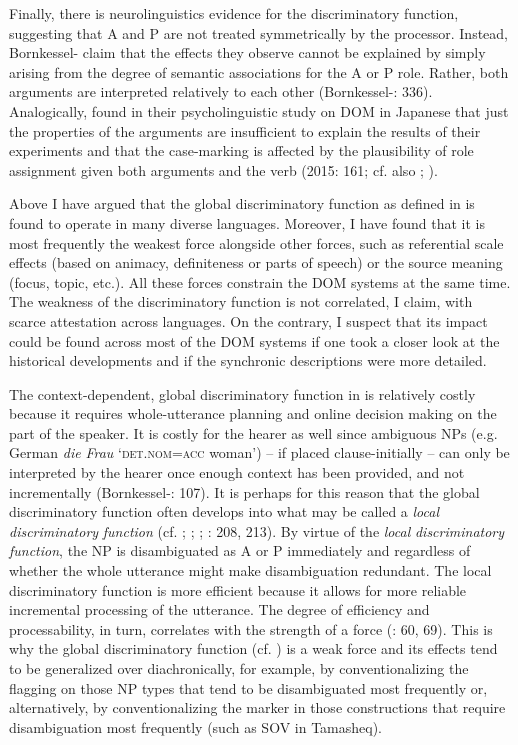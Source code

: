 \documentclass[output=paper]{langsci/langscibook}
\begin{document}
Finally, there is neurolinguistics evidence for the discriminatory function, suggesting that A and P are not treated symmetrically by the processor. Instead, Bornkessel-\citet{SchlesewskySchlesewsky2015} claim that the effects they observe cannot be explained by simply arising from the degree of semantic associations for the A or P role. Rather, both arguments are interpreted relatively to each other (Bornkessel-\citealt{SchlesewskySchlesewsky2015}: 336). Analogically, \citet{KurumadaJaeger2015} found in their psycholinguistic study on DOM in Japanese that just the properties of the arguments are insufficient to explain the results of their experiments and that the case-marking is affected by the plausibility of role assignment given both arguments and the verb (2015: 161; cf. also \citealt{AhnCho2007}; \citealt{FedzechkinaEtAl2012}).

Above I have argued that the global discriminatory function as defined in  is found to operate in many diverse languages. Moreover, I have found that it is most frequently the weakest force alongside other forces, such as referential scale effects (based on animacy, definiteness or parts of speech) or the source meaning (focus, topic, etc.). All these forces constrain the DOM systems at the same time. The weakness of the discriminatory function is not correlated, I claim, with scarce attestation across languages. On the contrary, I suspect that its impact could be found across most of the DOM systems if one took a closer look at the historical developments and if the synchronic descriptions were more detailed. 

The context-dependent, global discriminatory function in  is relatively costly because it requires whole-utterance planning and online decision making on the part of the speaker. It is costly for the hearer as well since ambiguous NPs (e.g. German \textit{die} \textit{Frau} ‘\textsc{det.nom=acc} woman’) – if placed clause-initially – can only be interpreted by the hearer once enough context has been provided, and not incrementally (Bornkessel-\citealt{SchlesewskySchlesewsky2014}: 107). It is perhaps for this reason that the global discriminatory function often develops into what may be called a \textit{local} \textit{discriminatory} \textit{function} (cf. \citealt{Aissen2003}; \citealt{ZeevatJäger2002}; \citealt{Jäger2004}; \citealt{Malchukov2008}: 208, 213). By virtue of the \textit{local} \textit{discriminatory} \textit{function}, the NP is disambiguated as A or P immediately and regardless of whether the whole utterance might make disambiguation redundant. The local discriminatory function is more efficient because it allows for more reliable incremental processing of the utterance. The degree of efficiency and processability, in turn, correlates with the strength of a force (\citealt{Hawkins2014}: 60, 69). This is why the global discriminatory function (cf. ) is a weak force and its effects tend to be generalized over diachronically, for example, by conventionalizing the flagging on those NP types that tend to be disambiguated most frequently or, alternatively, by conventionalizing the marker in those constructions that require disambiguation most frequently (such as SOV in Tamasheq). 
\end{document}
